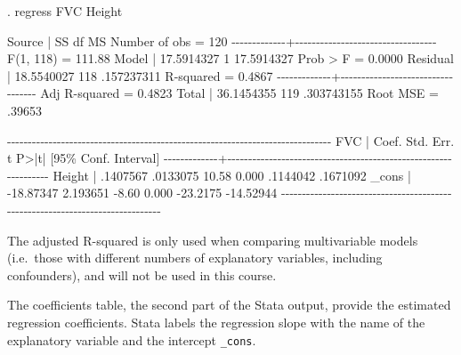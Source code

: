 \documentclass[
]{memoir}
\newenvironment{Shaded}{\begin{snugshade}}{\end{snugshade}}
\newcommand{\NormalTok}[1]{#1}
\begin{document}
\begin{Shaded}
\begin{Highlighting}[]
\NormalTok{. regress FVC Height}

\NormalTok{      Source |       SS           df       MS      Number of obs   =       120}
\NormalTok{{-}{-}{-}{-}{-}{-}{-}{-}{-}{-}{-}{-}{-}+{-}{-}{-}{-}{-}{-}{-}{-}{-}{-}{-}{-}{-}{-}{-}{-}{-}{-}{-}{-}{-}{-}{-}{-}{-}{-}{-}{-}{-}{-}{-}{-}{-}{-}   F(1, 118)       =    111.88}
\NormalTok{       Model |  17.5914327         1  17.5914327   Prob \textgreater{} F        =    0.0000}
\NormalTok{    Residual |  18.5540027       118  .157237311   R{-}squared       =    0.4867}
\NormalTok{{-}{-}{-}{-}{-}{-}{-}{-}{-}{-}{-}{-}{-}+{-}{-}{-}{-}{-}{-}{-}{-}{-}{-}{-}{-}{-}{-}{-}{-}{-}{-}{-}{-}{-}{-}{-}{-}{-}{-}{-}{-}{-}{-}{-}{-}{-}{-}   Adj R{-}squared   =    0.4823}
\NormalTok{       Total |  36.1454355       119  .303743155   Root MSE        =    .39653}

\NormalTok{{-}{-}{-}{-}{-}{-}{-}{-}{-}{-}{-}{-}{-}{-}{-}{-}{-}{-}{-}{-}{-}{-}{-}{-}{-}{-}{-}{-}{-}{-}{-}{-}{-}{-}{-}{-}{-}{-}{-}{-}{-}{-}{-}{-}{-}{-}{-}{-}{-}{-}{-}{-}{-}{-}{-}{-}{-}{-}{-}{-}{-}{-}{-}{-}{-}{-}{-}{-}{-}{-}{-}{-}{-}{-}{-}{-}{-}{-}}
\NormalTok{         FVC |      Coef.   Std. Err.      t    P\textgreater{}|t|     [95\% Conf. Interval]}
\NormalTok{{-}{-}{-}{-}{-}{-}{-}{-}{-}{-}{-}{-}{-}+{-}{-}{-}{-}{-}{-}{-}{-}{-}{-}{-}{-}{-}{-}{-}{-}{-}{-}{-}{-}{-}{-}{-}{-}{-}{-}{-}{-}{-}{-}{-}{-}{-}{-}{-}{-}{-}{-}{-}{-}{-}{-}{-}{-}{-}{-}{-}{-}{-}{-}{-}{-}{-}{-}{-}{-}{-}{-}{-}{-}{-}{-}{-}{-}}
\NormalTok{      Height |   .1407567   .0133075    10.58   0.000     .1144042    .1671092}
\NormalTok{       \_cons |  {-}18.87347   2.193651    {-}8.60   0.000     {-}23.2175   {-}14.52944}
\NormalTok{{-}{-}{-}{-}{-}{-}{-}{-}{-}{-}{-}{-}{-}{-}{-}{-}{-}{-}{-}{-}{-}{-}{-}{-}{-}{-}{-}{-}{-}{-}{-}{-}{-}{-}{-}{-}{-}{-}{-}{-}{-}{-}{-}{-}{-}{-}{-}{-}{-}{-}{-}{-}{-}{-}{-}{-}{-}{-}{-}{-}{-}{-}{-}{-}{-}{-}{-}{-}{-}{-}{-}{-}{-}{-}{-}{-}{-}{-}}
\end{Highlighting}
\end{Shaded}

The adjusted R-squared is only used when comparing multivariable models (i.e.~those with different numbers of explanatory variables, including confounders), and will not be used in this course.

The coefficients table, the second part of the Stata output, provide the estimated regression coefficients. Stata labels the regression slope with the name of the explanatory variable and the intercept \texttt{\_cons}.
\end{document}
